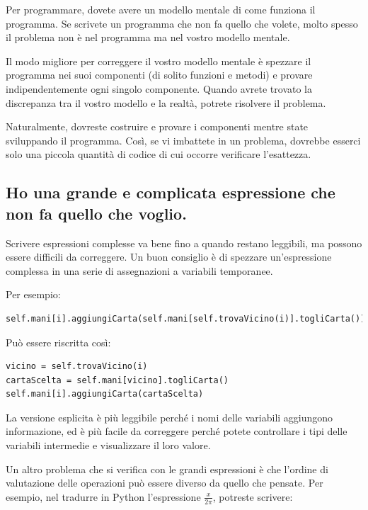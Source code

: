\documentclass[10pt]{book}
\begin{document}
Per programmare, dovete avere un modello mentale di come funziona il programma. Se scrivete un programma che non fa quello che volete, molto spesso il problema non è nel programma ma nel vostro modello mentale.

Il modo migliore per correggere il vostro modello mentale è spezzare il programma nei suoi componenti (di solito funzioni e metodi) e provare indipendentemente ogni singolo componente.
Quando avrete trovato la discrepanza tra il vostro modello e la realtà, potrete risolvere il problema.

Naturalmente, dovreste costruire e provare i componenti mentre state sviluppando il programma. Così, se vi imbattete in un problema, dovrebbe esserci solo una piccola quantità di codice di cui occorre verificare l'esattezza.


\subsection{Ho una grande e complicata espressione che non fa quello che voglio.}


Scrivere espressioni complesse va bene fino a quando restano leggibili, ma possono essere difficili da correggere. Un buon consiglio è di spezzare un'espressione complessa in una serie di assegnazioni a variabili temporanee.

Per esempio:

\begin{verbatim}
self.mani[i].aggiungiCarta(self.mani[self.trovaVicino(i)].togliCarta())
\end{verbatim}
%
Può essere riscritta così:

\begin{verbatim}
vicino = self.trovaVicino(i)
cartaScelta = self.mani[vicino].togliCarta()
self.mani[i].aggiungiCarta(cartaScelta)
\end{verbatim}
%
La versione esplicita è più leggibile perché i nomi delle variabili aggiungono informazione, ed è più facile da correggere perché potete controllare i tipi delle variabili intermedie e visualizzare il loro valore.

Un altro problema che si verifica con le grandi espressioni è che l'ordine di valutazione delle operazioni può essere diverso da quello che pensate.
Per esempio, nel tradurre in Python l'espressione
$\frac{x}{2 \pi}$, potreste scrivere:
\end{document}
